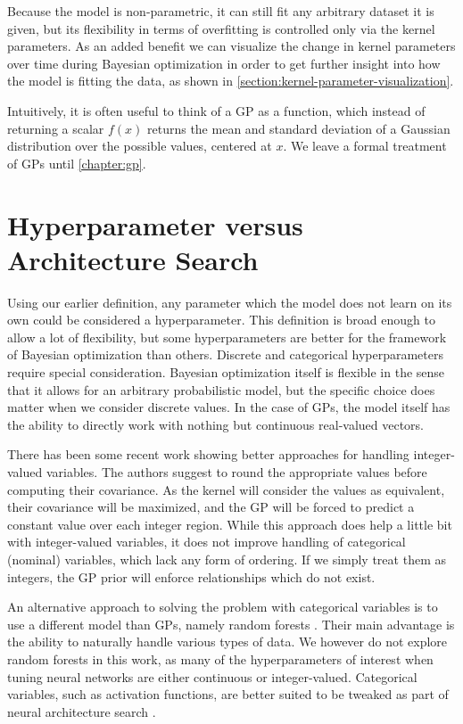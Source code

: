Because the model is non-parametric, it can still fit any arbitrary dataset it
is given, but its flexibility in terms of overfitting is controlled only via
the kernel parameters. As an added benefit we can visualize the change in
kernel parameters over time during Bayesian optimization in order to get
further insight into how the model is fitting the data, as shown in
\autoref{section:kernel-parameter-visualization}.

Intuitively, it is often useful to think of a GP as a function, which instead
of returning a scalar $f(x)$ returns the mean and standard deviation of a
Gaussian distribution over the possible values, centered at $x$. We leave a formal
treatment of GPs until \autoref{chapter:gp}.


\section{Hyperparameter versus Architecture Search}
\label{section:architecture-search}

Using our earlier definition, any parameter which the model does not learn on
its own could be considered a hyperparameter. This definition is broad enough
to allow a lot of flexibility, but some hyperparameters are better for the
framework of Bayesian optimization than others. Discrete and categorical
hyperparameters require special consideration. Bayesian optimization itself is
flexible in the sense that it allows for an arbitrary probabilistic model, but
the specific choice does matter when we consider discrete values. In the case
of GPs, the model itself has the ability to directly work with nothing
but continuous real-valued vectors.

There has been some recent work \citep{integer-valued-gp} showing better
approaches for handling integer-valued variables. The authors suggest to
round the appropriate values before computing their covariance. As the
kernel will consider the values as equivalent, their covariance will be maximized,
and the GP will be forced to predict a constant value over each integer region.
While this approach does help a little bit with integer-valued variables, it
does not improve handling of categorical (nominal) variables, which lack any form of
ordering. If we simply treat them as integers, the GP prior will enforce
relationships which do not exist.

An alternative approach to solving the problem with categorical variables is to
use a different model than GPs, namely random forests
\citep{nando-bayesian-out-of-the-loop}. Their main advantage is the ability to
naturally handle various types of data. We however do not explore random
forests in this work, as many of the hyperparameters of interest when tuning
neural networks are either continuous or integer-valued. Categorical variables,
such as activation functions, are better suited to be tweaked as part of neural
architecture search \citep{nasnet}.

